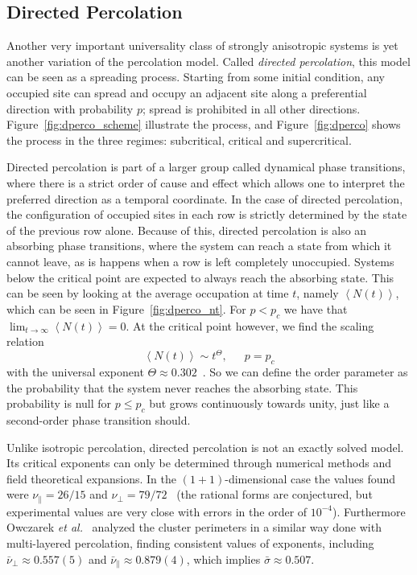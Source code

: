 \subsection{Directed Percolation}
\label{sec:dp}

Another very important universality class of strongly anisotropic systems is
yet another variation of the percolation model. Called \textit{directed
percolation}, this model can be seen as a spreading process. Starting from
some initial condition, any occupied site can spread and occupy an adjacent
site along a preferential direction with probability $p$; spread is prohibited
in all other directions. Figure~\ref{fig:dperco_scheme} illustrate the process,
and Figure~\ref{fig:dperco} shows the process in the three regimes:
subcritical, critical and supercritical.

Directed percolation is part of a larger group called dynamical phase
transitions, where there is a strict order of cause and effect which allows one
to interpret the preferred direction as a temporal coordinate. In the case of
directed percolation, the configuration of occupied sites in each row is
strictly determined by the state of the previous row alone. Because of this,
directed percolation is also an absorbing phase transitions, where the system
can reach a state from which it cannot leave, as is happens when a row is left
completely unoccupied. Systems below the critical point are expected to always
reach the absorbing state. This can be seen by looking at the average
occupation at time $t$, namely $\left\langle N(t)\right\rangle$, which can be
seen in Figure~\ref{fig:dperco_nt}. For $p<p_c$ we have that
$\lim_{t\rightarrow\infty}\left\langle N(t)\right\rangle=0$. At the critical
point however, we find the scaling relation
\begin{equation}
    \left\langle N\left(t\right)\right\rangle \sim t^{\Theta},
    \,\,\,\,\,\,\,\,\,
    p=p_c
\end{equation}
with the universal exponent $\Theta\approx0.302$~\cite{Henkel2008}. So we can
define the order parameter as the probability that the system never reaches the
absorbing state. This probability is null for $p\leq p_c$ but grows
continuously towards unity, just like a second-order phase transition should.

Unlike isotropic percolation, directed percolation is not an exactly solved
model. Its critical exponents can only be determined through numerical methods
and field theoretical expansions. In the $(1+1)$-dimensional case the values
found were $\nu_\parallel=26/15$ and $\nu_\perp=79/72$~\cite{Hinrichsen2000}
(the rational forms are conjectured, but experimental values are very close
with errors in the order of $10^{-4}$). Furthermore Owczarek \textit{et
al.}~\cite{Owczarek1997} analyzed the cluster perimeters in a similar way
done with multi-layered percolation, finding consistent values of exponents,
including $\bar{\nu}_\perp\approx0.557(5)$ and
$\bar{\nu}_\parallel\approx0.879(4)$, which implies $\bar{\sigma}\approx0.507$.

